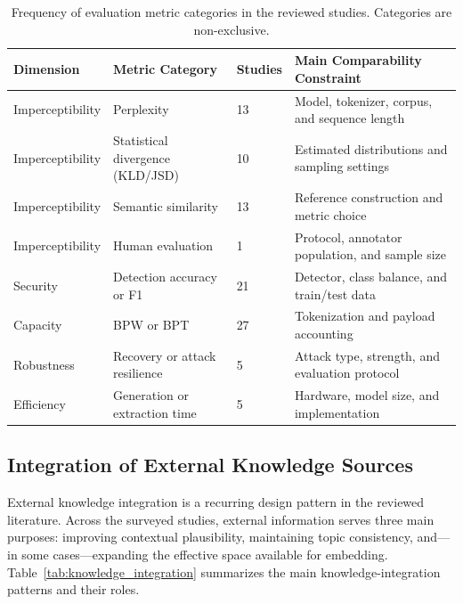 \begin{table}[t]
  \centering
  \footnotesize
  \caption{Frequency of evaluation metric categories in the reviewed studies. Categories are non-exclusive.}
  \label{tab:evaluation_metrics_overview}
  \begin{tabular}{|p{}|p{}|p{}|p{}|}
    \hline
    \textbf{Dimension} & \textbf{Metric Category} & \textbf{Studies} & \textbf{Main Comparability Constraint} \\
    \hline
    Imperceptibility & Perplexity & 13 & Model, tokenizer, corpus, and sequence length \\\hline
    Imperceptibility & Statistical divergence (KLD/JSD) & 10 & Estimated distributions and sampling settings \\\hline
    Imperceptibility & Semantic similarity & 13 & Reference construction and metric choice \\\hline
    Imperceptibility & Human evaluation & 1 & Protocol, annotator population, and sample size \\\hline
    Security & Detection accuracy or F1 & 21 & Detector, class balance, and train/test data \\\hline
    Capacity & BPW or BPT & 27 & Tokenization and payload accounting \\\hline
    Robustness & Recovery or attack resilience & 5 & Attack type, strength, and evaluation protocol \\\hline
    Efficiency & Generation or extraction time & 5 & Hardware, model size, and implementation \\
    \hline
  \end{tabular}
\end{table}

\subsection{Integration of External Knowledge Sources}
\label{sec:related-rq4}

External knowledge integration is a recurring design pattern in the reviewed literature. Across the surveyed studies, external information serves three main purposes: improving contextual plausibility, maintaining topic consistency, and---in some cases---expanding the effective space available for embedding. Table~\ref{tab:knowledge_integration} summarizes the main knowledge-integration patterns and their roles.

